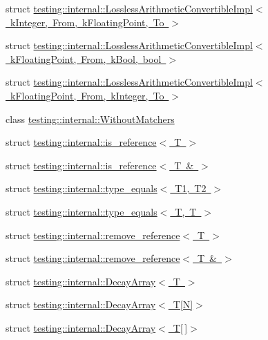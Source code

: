 \begin{DoxyCompactItemize}
\item 
struct \mbox{\hyperlink{structtesting_1_1internal_1_1LosslessArithmeticConvertibleImpl_3_01kInteger_00_01From_00_01kFloatingPoint_00_01To_01_4}{testing\+::internal\+::\+Lossless\+Arithmetic\+Convertible\+Impl$<$ k\+Integer, From, k\+Floating\+Point, To $>$}}
\item 
struct \mbox{\hyperlink{structtesting_1_1internal_1_1LosslessArithmeticConvertibleImpl_3_01kFloatingPoint_00_01From_00_01kBool_00_01bool_01_4}{testing\+::internal\+::\+Lossless\+Arithmetic\+Convertible\+Impl$<$ k\+Floating\+Point, From, k\+Bool, bool $>$}}
\item 
struct \mbox{\hyperlink{structtesting_1_1internal_1_1LosslessArithmeticConvertibleImpl_3_01kFloatingPoint_00_01From_00_01kInteger_00_01To_01_4}{testing\+::internal\+::\+Lossless\+Arithmetic\+Convertible\+Impl$<$ k\+Floating\+Point, From, k\+Integer, To $>$}}
\item 
class \mbox{\hyperlink{classtesting_1_1internal_1_1WithoutMatchers}{testing\+::internal\+::\+Without\+Matchers}}
\item 
struct \mbox{\hyperlink{structtesting_1_1internal_1_1is__reference}{testing\+::internal\+::is\+\_\+reference$<$ T $>$}}
\item 
struct \mbox{\hyperlink{structtesting_1_1internal_1_1is__reference_3_01T_01_6_01_4}{testing\+::internal\+::is\+\_\+reference$<$ T \& $>$}}
\item 
struct \mbox{\hyperlink{structtesting_1_1internal_1_1type__equals}{testing\+::internal\+::type\+\_\+equals$<$ T1, T2 $>$}}
\item 
struct \mbox{\hyperlink{structtesting_1_1internal_1_1type__equals_3_01T_00_01T_01_4}{testing\+::internal\+::type\+\_\+equals$<$ T, T $>$}}
\item 
struct \mbox{\hyperlink{structtesting_1_1internal_1_1remove__reference}{testing\+::internal\+::remove\+\_\+reference$<$ T $>$}}
\item 
struct \mbox{\hyperlink{structtesting_1_1internal_1_1remove__reference_3_01T_01_6_01_4}{testing\+::internal\+::remove\+\_\+reference$<$ T \& $>$}}
\item 
struct \mbox{\hyperlink{structtesting_1_1internal_1_1DecayArray}{testing\+::internal\+::\+Decay\+Array$<$ T $>$}}
\item 
struct \mbox{\hyperlink{structtesting_1_1internal_1_1DecayArray_3_01T[N]_4}{testing\+::internal\+::\+Decay\+Array$<$ T\mbox{[}\+N\mbox{]}$>$}}
\item 
struct \mbox{\hyperlink{structtesting_1_1internal_1_1DecayArray_3_01T[]_4}{testing\+::internal\+::\+Decay\+Array$<$ T\mbox{[}$\,$\mbox{]}$>$}}

\end{DoxyCompactItemize}

